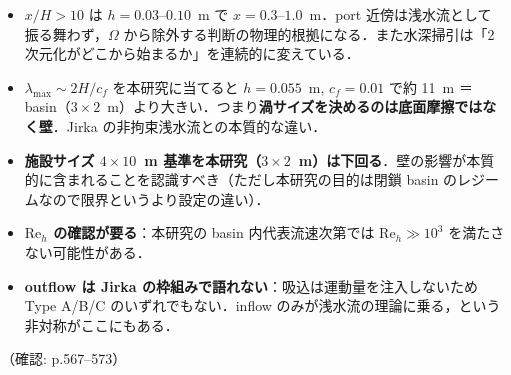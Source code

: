 \documentclass[11pt]{jsarticle}
\begin{document}
\begin{itemize}
\begin{itemize}
    \item \textbf{$x/H > 10$} は $h = 0.03$--$0.10$~m で $x = 0.3$--$1.0$~m．port 近傍は浅水流として振る舞わず，$\Omega$ から除外する判断の物理的根拠になる．また水深掃引は「2 次元化がどこから始まるか」を連続的に変えている．
    \item \textbf{$\lambda_\mathrm{max} \sim 2H/c_f$} を本研究に当てると $h = 0.055$~m, $c_f = 0.01$ で約 11~m ＝ basin（$3 \times 2$~m）より大きい．つまり\textbf{渦サイズを決めるのは底面摩擦ではなく壁}．Jirka の非拘束浅水流との本質的な違い．
    \item \textbf{施設サイズ $4 \times 10$~m 基準を本研究（$3 \times 2$~m）は下回る}．壁の影響が本質的に含まれることを認識すべき（ただし本研究の目的は閉鎖 basin のレジームなので限界というより設定の違い）．
    \item \textbf{$\mathrm{Re}_h$ の確認が要る}：本研究の basin 内代表流速次第では $\mathrm{Re}_h \gg 10^3$ を満たさない可能性がある．
    \item \textbf{outflow は Jirka の枠組みで語れない}：吸込は運動量を注入しないため Type A/B/C のいずれでもない．inflow のみが浅水流の理論に乗る，という非対称がここにもある．
  \end{itemize}
\end{itemize}
\noindent（確認: p.567--573）
\end{document}
